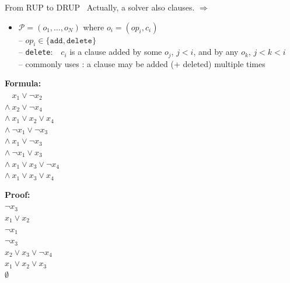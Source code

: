 \documentclass[t,english]{sdqbeamer}
\begin{document}
\begin{frame}{From RUP to DRUP~\cite{heule2013trimming}}
	Actually, a solver also  clauses. $\Rightarrow$ 
	\begin{itemize}
		\item $\mathcal{P} = (o_1, \ldots, o_N)$ where $o_i = (op_i, c_i)$\\
		-- $op_i \in \{\texttt{add}, \texttt{delete}\}$\\
		-- \texttt{delete}:\ \ $c_i$ is a clause added by some $o_j$, $j<i$, and  by any $o_k$, $j<k<i$\\
		-- commonly uses : a clause may be added (+ deleted) multiple times
	\end{itemize}
	
	\pause
	\vspace*{6mm}
	\begin{center}
		\begin{minipage}[c][8cm][t]{0.4\textwidth}
			\textbf{Formula:}\\[1mm]
			\ttfamily%
			$\phantom{\wedge \ }x_1 \vee \neg x_2$ \\
			$\wedge \ x_2 \vee \neg x_4$ \\
			$\wedge \ x_1 \vee x_2 \vee x_4$ \\
			$\wedge \ \neg x_1 \vee \neg x_3$ \\
			$\wedge \ x_1 \vee \neg x_3$ \\
			$\wedge \ \neg x_1 \vee x_3$ \\
			$\wedge \ x_1 \vee x_3 \vee \neg x_4$ \\
			$\wedge \ x_1 \vee x_3 \vee x_4$
		\end{minipage}%
		\begin{minipage}[c][8cm][t]{0.4\textwidth}
			\textbf{Proof:}\\[1mm]
			\ttfamily%
			 $\neg x_3$\\
			 $x_1 \vee x_2$\\
			 $\neg x_1$\\
			 $\neg x_3$\\
			 $x_2 \vee x_3 \vee \neg x_4$\\
			 $x_1 \vee x_2 \vee x_3$\\
			 $\emptyset$
		\end{minipage}
	\end{center}
\end{frame}
\end{document}
